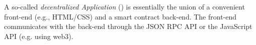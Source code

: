 \subsubsection{\dapp}

A so-called \emph{decentralized Application} (\dapp) is essentially
the union of a convenient front-end (e.g., HTML/CSS) and a smart contract
back-end. The front-end communicates with the back-end through the JSON
RPC API or the JavaScript API (e.g. using web3).


 